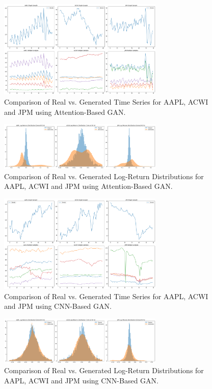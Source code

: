 \documentclass{article}
\begin{document}
\begin{figure}[h!]
    \centering
    \includegraphics[width=0.7\textwidth]{attention_gen_samples}
    \caption{Comparison of Real vs. Generated Time Series for AAPL, ACWI and JPM using Attention-Based GAN.}
    \label{fig:attention_comparison}
\end{figure}

\begin{figure}[h!]
    \centering
    \includegraphics[width=0.7\textwidth]{attention_distributions}
    \caption{Comparison of Real vs. Generated Log-Return Distributions for AAPL, ACWI and JPM using Attention-Based GAN.}
    \label{fig:attention_comparison}
\end{figure}

\begin{figure}[h!]
    \centering
    \includegraphics[width=0.7\textwidth]{CNN_gen_samples}
    \caption{Comparison of Real vs. Generated Time Series for AAPL, ACWI and JPM using CNN-Based GAN.}
    \label{fig:attention_comparison}
\end{figure}

\begin{figure}[h!]
    \centering
    \includegraphics[width=0.7\textwidth]{cnn_distributions}
    \caption{Comparison of Real vs. Generated Log-Return Distributions for AAPL, ACWI and JPM using CNN-Based GAN.}
    \label{fig:attention_comparison}
\end{figure}
\end{document}
